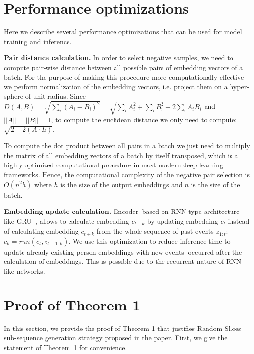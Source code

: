 \documentclass{article}
\begin{document}
\section{Performance optimizations} \label{sec-perf-opt}

Here we describe several performance optimizations that can be used for model training and inference.

\textbf{Pair distance calculation.} In order to select negative samples, we need to compute pair-wise distance between all possible pairs of embedding vectors of a batch. For the purpose of making this procedure more computationally effective we perform normalization of the embedding vectors, i.e. project them on a hyper-sphere of unit radius. Since $D(A,B) = \sqrt{\sum_i(A_i - B_i)^2} = \sqrt{\sum_i A_i^2 + \sum_i B_i^2 - 2\sum_i A_i B_i} $ and $||A||= ||B||=1$, to compute the euclidean distance we only need to compute: $\sqrt{2 - 2(A \cdot B)}$.

To compute the dot product between all pairs in a batch we just need to multiply the matrix of all embedding vectors of a batch by itself transposed, which is a highly optimized computational procedure in most modern deep learning frameworks. Hence, the computational complexity of the negative pair selection is $O(n^2h)$ where $h$ is the size of the output embeddings and $n$ is the size of the batch.

\textbf{Embedding update calculation.} Encoder, based on RNN-type architecture like GRU~\cite{Cho2014LearningPR}, allows to calculate embedding $c_{t+k}$ by updating embedding $c_t$ instead of  calculating embedding $c_{t+k}$ from the whole sequence of past events $z_{1:t}$: $c_k = rnn(c_t, z_{t+1:k})$. We use this optimization to reduce inference time to update already existing person embeddings with new events, occurred after the calculation of embeddings. This is possible due to the recurrent nature of RNN-like networks.

\section{Proof of Theorem 1} \label{sec-proof}

In this section, we provide the proof of Theorem 1 that justifies Random Slices sub-sequence generation strategy proposed in the paper. First, we give the statement of Theorem~1 for convenience.
\end{document}
